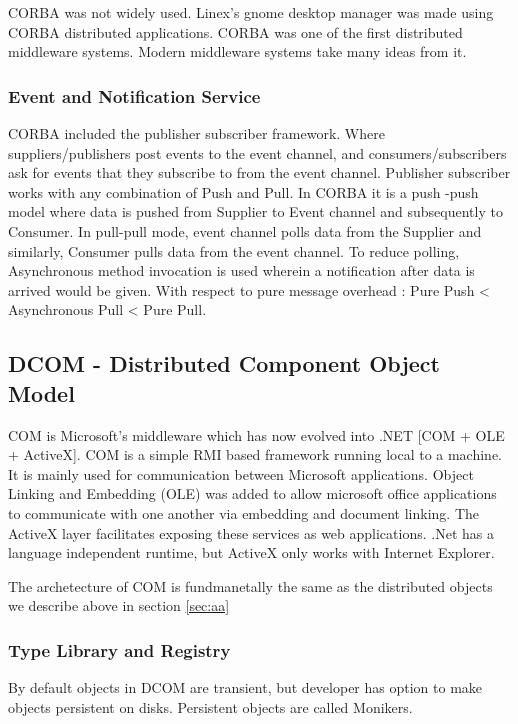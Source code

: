 \documentclass[a4paper]{article}
\begin{document}
CORBA was not widely used. Linex's gnome desktop manager was made using CORBA distributed applications. CORBA was one of the first distributed middleware systems. Modern middleware systems take many ideas from it.

\subsubsection{Event and Notification Service}

CORBA included the publisher subscriber framework. Where suppliers/publishers post events to the event channel, and consumers/subscribers ask for events that they subscribe to from the event channel. Publisher subscriber works with any combination of Push and Pull. In CORBA it is a push -push model where data is pushed from Supplier to Event channel and subsequently to Consumer. In pull-pull mode, event channel polls data from the Supplier and similarly, Consumer pulls data from the event channel. To reduce polling, Asynchronous method invocation is used wherein a notification after data is arrived would be given. With respect to pure message overhead :  Pure Push < Asynchronous Pull < Pure Pull.

\subsection{DCOM - Distributed Component Object Model}

COM is Microsoft's middleware which has now evolved into .NET [COM + OLE + ActiveX]. COM is a simple RMI based framework running local to a machine. It is mainly used for communication between Microsoft applications. Object Linking and Embedding (OLE) was added to allow microsoft office applications to communicate with one another via embedding and document linking. The ActiveX layer facilitates exposing these services as web applications. .Net has a language independent runtime, but ActiveX only works with Internet Explorer.

The archetecture of COM is fundmanetally the same as the distributed objects we describe above in section \ref{sec:aa}

\subsubsection{Type Library and Registry}
By default objects in DCOM are transient, but developer has option to make objects persistent on disks. Persistent objects are called Monikers. 
\end{document}
